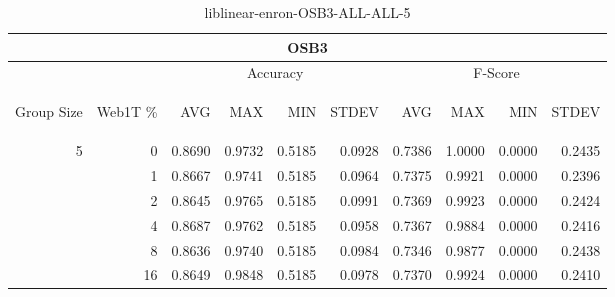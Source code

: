 \begin{center}
\begin{table}[htbp]
\begin{tabular}{ | r | r | r | r | r | r | r | r | r | r |}
\hline
\multicolumn{10}{|c|}{OSB3}\\
\hline
 & & \multicolumn{4}{|c|}{Accuracy} & \multicolumn{4}{|c|}{F-Score}\\ \cline{3-10}
\begin{sideways}Group Size\end{sideways} & \begin{sideways}Web1T \%\end{sideways} & \begin{sideways}AVG\end{sideways} & \begin{sideways}MAX\end{sideways} & \begin{sideways}MIN\end{sideways} & \begin{sideways}STDEV\end{sideways} & \begin{sideways}AVG\end{sideways} & \begin{sideways}MAX\end{sideways} & \begin{sideways}MIN\end{sideways} & \begin{sideways}STDEV\end{sideways}\\
\hline
\multirow{6}{*}{5}
 & 0 & 0.8690 & 0.9732 & 0.5185 & 0.0928 & 0.7386 & 1.0000 & 0.0000 & 0.2435\\ \cline{2-10}
 & 1 & 0.8667 & 0.9741 & 0.5185 & 0.0964 & 0.7375 & 0.9921 & 0.0000 & 0.2396\\ \cline{2-10}
 & 2 & 0.8645 & 0.9765 & 0.5185 & 0.0991 & 0.7369 & 0.9923 & 0.0000 & 0.2424\\ \cline{2-10}
 & 4 & 0.8687 & 0.9762 & 0.5185 & 0.0958 & 0.7367 & 0.9884 & 0.0000 & 0.2416\\ \cline{2-10}
 & 8 & 0.8636 & 0.9740 & 0.5185 & 0.0984 & 0.7346 & 0.9877 & 0.0000 & 0.2438\\ \cline{2-10}
 & 16 & 0.8649 & 0.9848 & 0.5185 & 0.0978 & 0.7370 & 0.9924 & 0.0000 & 0.2410\\ \cline{2-10}
\hline
\end{tabular}
\caption{liblinear-enron-OSB3-ALL-ALL-5}
\end{table}
\end{center}

